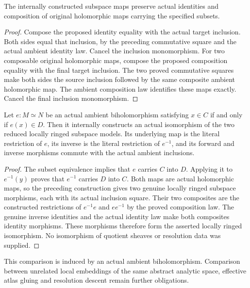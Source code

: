 \begin{theorem}
\label{hir:actual-analytic-subspace-map-functor-laws}
\leanok
The internally constructed subspace maps preserve actual identities and
composition of original holomorphic maps carrying the specified subsets.
\end{theorem}
\begin{proof}
Compose the proposed identity equality with the actual target inclusion.
Both sides equal that inclusion, by the preceding commutative square
and the actual ambient identity law. Cancel the inclusion monomorphism.
For two composable original holomorphic maps, compose the proposed
composition equality with the final target inclusion. The two proved
commutative squares make both sides the source inclusion followed by the
same composite ambient holomorphic map. The ambient composition law
identifies these maps exactly. Cancel the final inclusion monomorphism.
\end{proof}

\begin{theorem}
\label{hir:actual-analytic-subspace-biholomorphic-comparison}
\leanok
Let $e:M\simeq N$ be an actual ambient biholomorphism satisfying
$x\in C$ if and only if $e(x)\in D$. Then it internally constructs an
actual isomorphism of the two reduced locally ringed subspace models.
Its underlying map is the literal restriction of $e$, its inverse is the
literal restriction of $e^{-1}$, and its forward and inverse morphisms
commute with the actual ambient inclusions.
\end{theorem}
\begin{proof}
The subset equivalence implies that $e$ carries $C$ into $D$. Applying
it to $e^{-1}(y)$ proves that $e^{-1}$ carries $D$ into $C$. Both maps are
actual holomorphic maps, so the preceding construction gives two genuine
locally ringed subspace morphisms, each with its actual inclusion square.
Their two composites are the constructed restrictions of $e^{-1}e$ and
$ee^{-1}$ by the proved composition law. The genuine inverse identities
and the actual identity law make both composites identity morphisms.
These morphisms therefore form the asserted locally ringed isomorphism.
No isomorphism of quotient sheaves or resolution data was supplied.
\end{proof}

This comparison is induced by an actual ambient biholomorphism. Comparison
between unrelated local embeddings of the same abstract analytic space,
effective atlas gluing and resolution descent remain further obligations.
